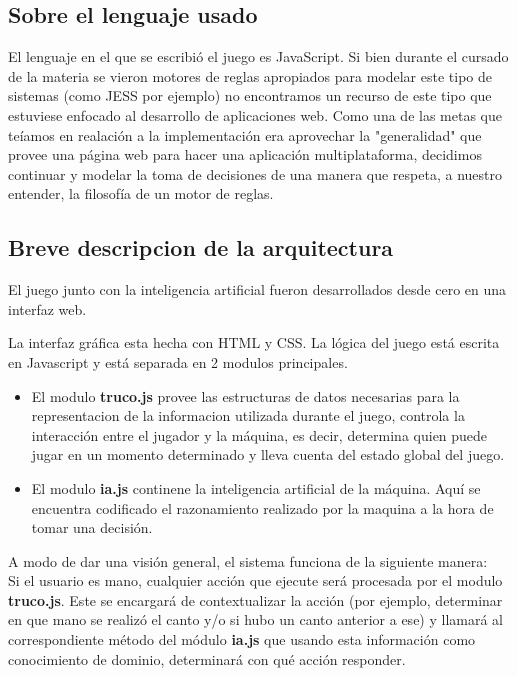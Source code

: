\documentclass[12pt,a4paper]{article}
\begin{document}
\subsection{Sobre el lenguaje usado}
El lenguaje en el que se escribi\'o el juego es JavaScript. Si bien durante el cursado de la materia se vieron motores de reglas 
apropiados para modelar este tipo de sistemas (como JESS por ejemplo) no encontramos un recurso de este tipo que estuviese enfocado
al desarrollo de aplicaciones web. Como una de las metas que te\'iamos en realaci\'on a la implementaci\'on era aprovechar la "generalidad" que
provee una p\'agina web para hacer una aplicaci\'on multiplataforma, decidimos continuar y modelar la toma de decisiones de 
una manera que respeta, a nuestro entender, la filosof\'ia de un motor de reglas.

\subsection{Breve descripcion de la arquitectura}
El juego junto con la inteligencia artificial fueron desarrollados desde cero en una interfaz web. 

La interfaz gr\'afica esta hecha con HTML y CSS. La l\'ogica del juego est\'a escrita en Javascript y est\'a separada en 2 modulos principales.  
\begin{itemize}
\item El modulo \textbf{truco.js} provee las estructuras de datos necesarias para la representacion de la informacion utilizada durante el juego,
controla la interacci\'on entre el jugador y la m\'aquina, es decir, determina quien puede jugar en un momento determinado y lleva cuenta del
estado global del juego.

\item El modulo \textbf{ia.js} continene la inteligencia artificial de la m\'aquina. Aqu\'i se encuentra codificado el razonamiento realizado por la maquina
a la hora de tomar una decisi\'on.

\end{itemize}

A modo de dar una visi\'on general, el sistema funciona de la siguiente manera: \\
Si el usuario es mano, cualquier acci\'on que ejecute ser\'a procesada por el modulo \textbf{truco.js}. Este se encargar\'a de contextualizar la
acci\'on (por ejemplo, determinar en que mano se realiz\'o el canto y/o si hubo un canto anterior a ese) y llamar\'a al correspondiente m\'etodo del
m\'odulo \textbf{ia.js} que usando esta informaci\'on como conocimiento de dominio, determinar\'a con qu\'e acci\'on responder.
\end{document}
